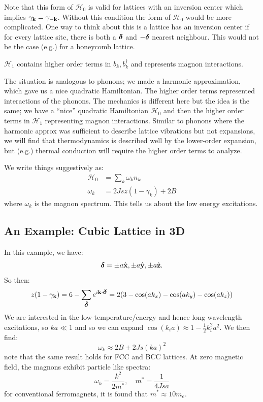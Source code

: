 Note that this form of $\mathcal{H}_0$ is valid for lattices with an inversion center which implies $\gamma_{\mathbf{k}} = \gamma_{-\mathbf{k}}$. Without this condition the form of $\mathcal{H}_0$ would be more complicated. One way to think about this is a lattice has an inversion center if for every lattice site, there is both a $\mbox{\boldmath$ \delta $}$ and $-\mbox{\boldmath$ \delta $}$ nearest neighbour. This would not be the case (e.g.) for a honeycomb lattice.

$\mathcal{H}_1$ contains higher order terms in $b_k, b_k^\dag$ and represents magnon interactions.

The situation is analogous to phonons; we made a harmonic approximation, which gave us a nice quadratic Hamiltonian. The higher order terms represented interactions of the phonons. The mechanics is different here but the idea is the same; we have a ``nice'' quadratic Hamiltonian $\mathcal{H}_0$ and then the higher order terms in $\mathcal{H}_1$ representing magnon interactions. Similar to phonons where the harmonic approx was sufficient to describe lattice vibrations but not expansions, we will find that thermodynamics is described well by the lower-order expansion, but (e.g.) thermal conduction will require the higher order terms to analyze.

We write things suggestively as:
\begin{equation}
    \begin{split}
        \mathcal{H}_0 &= \sum_k \omega_k n_k
        \\ \omega_k &= 2Jsz(1 - \gamma_k) + 2B
    \end{split}
\end{equation}
where $\omega_k$ is the magnon spectrum. This tells us about the low energy excitations. 

\subsection{An Example: Cubic Lattice in 3D}
In this example, we have:
\begin{equation}
    \mbox{\boldmath$ \delta $} = \pm a\hat{\mathbf{x}}, \pm a\hat{\mathbf{y}}, \pm a\hat{\mathbf{z}}.
\end{equation}
So then:
\begin{align*}
    z(1-\gamma_{\mathbf{k}}) = 6 - \sum_{\mbox{\boldmath$ \delta $}}e^{i\mathbf{k} \cdot \mbox{\boldmath$ \delta $}} = 2(3 - \cos(ak_x) - \cos(ak_y) - \cos(ak_z))
\end{align*}
We are interested in the low-temperature/energy and hence long wavelength excitations, so $ka \ll 1$ and so we can expand $\cos(k_ia) \approx 1- \frac{1}{2}k_i^2 a^2$. We then find:
\begin{equation}
    \omega_k \approx 2B + 2Js(ka)^2
\end{equation}
note that the same result holds for FCC and BCC lattices. At zero magnetic field, the magnons exhibit particle like spectra:
\begin{equation}
    \omega_k = \frac{k^2}{2m^*}, \quad m^* = \frac{1}{4Jsa}
\end{equation}
for conventional ferromagnets, it is found that $m^* \approx 10m_e$.

